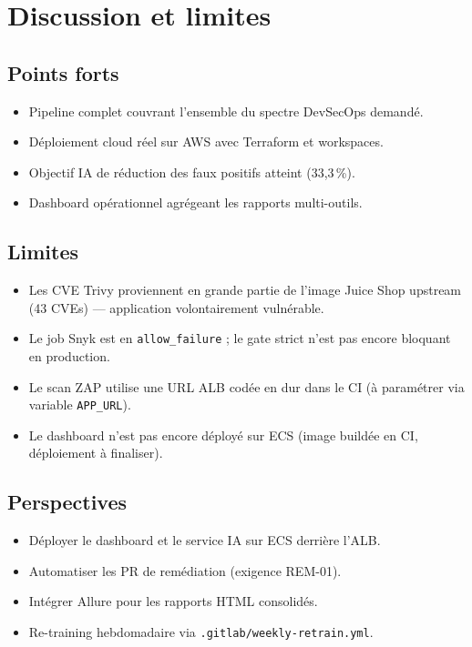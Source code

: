 \documentclass[12pt,a4paper]{report}
\begin{document}
\chapter{Discussion et limites}

\section{Points forts}
\begin{itemize}
    \item Pipeline complet couvrant l'ensemble du spectre DevSecOps demandé.
    \item Déploiement cloud réel sur AWS avec Terraform et workspaces.
    \item Objectif IA de réduction des faux positifs atteint (33,3\,\%).
    \item Dashboard opérationnel agrégeant les rapports multi-outils.
\end{itemize}

\section{Limites}
\begin{itemize}
    \item Les CVE Trivy proviennent en grande partie de l'image Juice Shop upstream (43 CVEs) --- application volontairement vulnérable.
    \item Le job Snyk est en \texttt{allow\_failure} ; le gate strict n'est pas encore bloquant en production.
    \item Le scan ZAP utilise une URL ALB codée en dur dans le CI (à paramétrer via variable \texttt{APP\_URL}).
    \item Le dashboard n'est pas encore déployé sur ECS (image buildée en CI, déploiement à finaliser).
\end{itemize}

\section{Perspectives}
\begin{itemize}
    \item Déployer le dashboard et le service IA sur ECS derrière l'ALB.
    \item Automatiser les PR de remédiation (exigence REM-01).
    \item Intégrer Allure pour les rapports HTML consolidés.
    \item Re-training hebdomadaire via \texttt{.gitlab/weekly-retrain.yml}.
\end{itemize}
\end{document}
